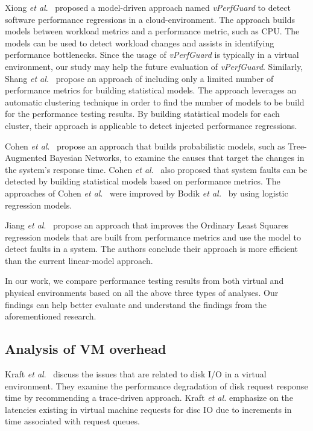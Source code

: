 \documentclass[smallextended]{svjour3}       %
\begin{document}
Xiong \textit{et al$.$}~\cite{xiong2013vperfguard} proposed a model-driven approach named \textit{vPerfGuard} to detect software performance regressions in a cloud-environment. The approach builds models between workload metrics and a performance metric, such as CPU. The models can be used to detect workload changes and assists in identifying performance bottlenecks. Since the usage of \emph{vPerfGuard} is typically in a virtual environment, our study may help the future evaluation of \textit{vPerfGuard}. Similarly, Shang\textit{ et al.}~\cite{Shang:2015:ADP:2668930.2688052} propose an approach of including only a limited number of performance metrics for building statistical models. The approach leverages an automatic clustering technique in order to find the number of models to be build for the performance testing results. By building statistical models for each cluster, their approach is applicable to detect injected performance regressions. 


Cohen \textit{et al$.$}~\cite{cohen2004correlating} propose an approach that builds probabilistic models, such as Tree-Augmented Bayesian Networks, to examine the causes that target the changes in the system's response time. Cohen \textit{et al$.$}~\cite{Cohen:2005:CIC:1095810.1095821} also proposed that system faults can be detected by building statistical models based on performance metrics. The approaches of Cohen \textit{et al$.$}~\cite{cohen2004correlating, Cohen:2005:CIC:1095810.1095821} were improved by Bodik \textit{et al.}~\cite{bodik2008hilighter} by using logistic regression models.

Jiang \emph{et al$.$}~\cite{Jiang:2009:SMM:1555228.1555233} propose an approach that improves the Ordinary Least Squares regression models that are built from performance metrics and use the model to detect faults in a system. The authors conclude their approach is more efficient than the current linear-model approach.

In our work, we compare performance testing results from both virtual and physical environments based on all the above three types of analyses. Our findings can help better evaluate and understand the findings from the aforementioned research.


\subsection{Analysis of VM overhead}

Kraft \textit{et al$.$}~\cite{kraft2011io} discuss the issues that are related to disk I/O in a virtual environment. They examine the performance degradation of disk request response time by recommending a trace-driven approach. Kraft \textit{et al.} emphasize on the latencies existing in virtual machine requests for disc IO due to increments in time associated with request queues. 
\end{document}
